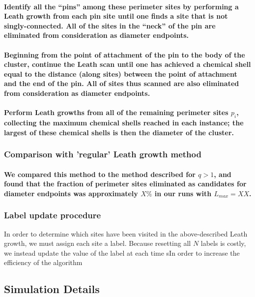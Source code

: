 \documentclass{umthesis}
\begin{document}
\paragraph{Identify all the ``pins'' among these perimeter sites by performing a Leath growth from each pin site until one finds a site that is not singly-connected.  All of the sites in the ``neck'' of the pin are eliminated from consideration as diameter endpoints.}
\label{sec-3.2.4.6.4}
\paragraph{Beginning from the point of attachment of the pin to the body of the cluster, continue the Leath scan until one has achieved a chemical shell equal to the distance (along sites) between the point of attachment and the end of the pin.  All of sites thus scanned are also eliminated from consideration as diameter endpoints.}
\label{sec-3.2.4.6.5}
\paragraph{Perform Leath growths from all of the remaining perimeter sites $p_i$, collecting the maximum chemical shells reached in each instance; the largest of these chemical shells is then the diameter of the cluster.}
\label{sec-3.2.4.6.6}
\subsubsection{Comparison with 'regular' Leath growth method}
\label{sec-3.2.4.7}
\paragraph{We compared this method to the method described for $q>1$, and found that the fraction of perimeter sites eliminated as candidates for diameter endpoints was approximately $X\%$ in our runs with $L_{max}=XX$.}
\label{sec-3.2.4.7.1}
\subsubsection{Label update procedure}
\label{sec-3.2.4.8}

In order to determine which sites have been visited in the above-described Leath growth, we must assign each site a label.  Because resetting all $N$ labels is costly, we instead update the value of the label at each time sIn order to increase the efficiency of the algorithm
\subsection{Simulation Details}
\label{sec-3.2.5}
\end{document}
